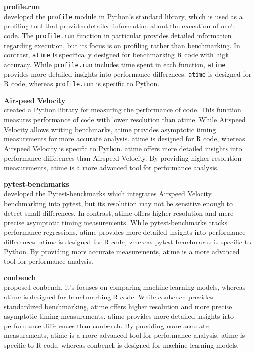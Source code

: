 \textbf{profile.run} \\
\citet{profile} developed the \texttt{profile} module in Python's standard library, which is used as a profiling tool that provides detailed information about the execution of one's code. The \texttt{profile.run} function in particular provides detailed information regarding execution, but its focus is on profiling rather than benchmarking. In contrast, \texttt{atime} is specifically designed for benchmarking R code with high accuracy. While \texttt{profile.run} includes time spent in each function, \texttt{atime} provides more detailed insights into performance differences. \texttt{atime} is designed for R code, whereas \texttt{profile.run} is specific to Python.
\vspace{0.1in}

\textbf{Airspeed Velocity} \\
\citet{airspeed_velocity} created a Python library for measuring the performance of code. This function measures performance of code with lower resolution than atime. While Airspeed Velocity allows writing benchmarks, atime provides asymptotic timing measurements for more accurate analysis. atime is designed for R code, whereas Airspeed Velocity is specific to Python. atime offers more detailed insights into performance differences than Airspeed Velocity. By providing higher resolution measurements, atime is a more advanced tool for performance analysis.
\vspace{0.1in}

\textbf{pytest-benchmarks} \\
\citet{pytest_benchmark} developed the Pytest-benchmarks which integrates Airspeed Velocity benchmarking into pytest, but its resolution may not be sensitive enough to detect small differences. In contrast, atime offers higher resolution and more precise asymptotic timing measurements. While pytest-benchmarks tracks performance regressions, atime provides more detailed insights into performance differences. atime is designed for R code, whereas pytest-benchmarks is specific to Python. By providing more accurate measurements, atime is a more advanced tool for performance analysis.
\vspace{0.1in}

\textbf{conbench} \\
\citet{conbench} proposed conbench, it's focuses on comparing machine learning models, whereas atime is designed for benchmarking R code. While conbench provides standardized benchmarking, atime offers higher resolution and more precise asymptotic timing measurements. atime provides more detailed insights into performance differences than conbench. By providing more accurate measurements, atime is a more advanced tool for performance analysis. atime is specific to R code, whereas conbench is designed for machine learning models.
\vspace{0.1in}

